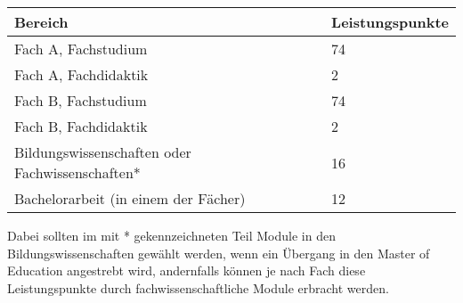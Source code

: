 \begin{table*}[htb]
	\centering

	\begin{tabular}{ll}
		\toprule
		Bereich & Leistungspunkte\\
		\midrule
		Fach A, Fachstudium & 74\\
		Fach A, Fachdidaktik & \phantom{0}2\\
		\addlinespace
		Fach B, Fachstudium & 74\\
		Fach B, Fachdidaktik & \phantom{0}2\\
		\addlinespace
		Bildungswissenschaften oder Fachwissenschaften* & 16\\
		\addlinespace
		Bachelorarbeit (in einem der Fächer) & 12\\
		\bottomrule
	\end{tabular}

\end{table*}
Dabei sollten im mit * gekennzeichneten Teil Module in den Bildungswissenschaften gewählt werden, wenn ein Übergang in den Master of Education angestrebt wird, andernfalls können je nach Fach diese Leistungspunkte durch fachwissenschaftliche Module erbracht werden.
